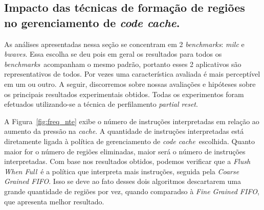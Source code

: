 \documentclass[12pt,twoside]{article}
\newcommand{\ccache}{\emph{code cache}}
\newcommand{\cache}{\emph{cache}}
\newcommand{\benchmarks}{\emph{benchmarks}}
\newcommand{\flush}{\emph{Flush When Full}}
\newcommand{\finefifo}{\emph{Fine Grained FIFO}}
\newcommand{\coarsefifo}{\emph{Coarse Grained FIFO}}
\begin{document}
\subsection{Impacto das técnicas de formação de regiões no gerenciamento de \ccache.}
As análises apresentadas nessa seção se concentram em 2 \benchmarks: \emph{milc} e \emph{bwaves}. Essa escolha se deu pois em geral os resultados para todos os \benchmarks~acompanham o mesmo padrão, portanto esses 2 aplicativos são representativos de todos. Por vezes uma característica avaliada é mais perceptível em um ou outro. A seguir, discorremos sobre nossas avaliações e hipóteses sobre os principais resultados experimentais obtidos. Todas os experimentos foram efetuados utilizando-se a técnica de perfilamento \emph{partial reset}.

A Figura~\ref{fig:freq_nte} exibe o número de instruções interpretadas em relação ao aumento da pressão na \cache. A quantidade de instruções interpretadas está diretamente ligada à política de gerenciamento de \ccache~escolhida. Quanto maior for o número de regiões eliminadas, maior será o número de instruções interpretadas. Com base nos resultados obtidos, podemos verificar que a \flush~é a política que interpreta mais instruções, seguida pela \coarsefifo. Isso se deve ao fato desses dois algoritmos descartarem uma grande quantidade de regiões por vez, quando comparadso à \finefifo, que apresenta melhor resultado.
\end{document}
